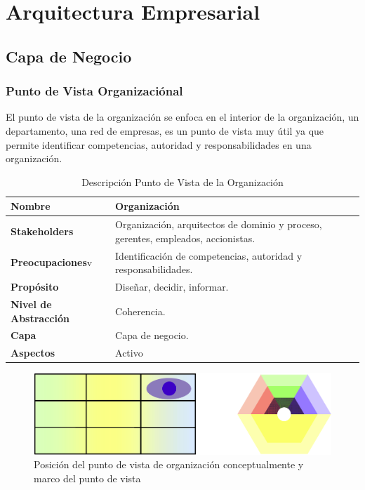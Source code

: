 \chapter{Arquitectura Empresarial}
  \section{Capa de Negocio}
    \subsection{Punto de Vista Organizaciónal}
    El punto de vista de la organización se enfoca en el interior de la organización, un departamento, una red de empresas, es un punto de vista muy útil ya que permite  identificar  competencias, autoridad y responsabilidades en una organización. \cite{ref9}
      \begin{table}[h]
        \centering
        \begin{tabular}{p{3.7cm}p{8cm}}
          \hline
          \textbf{Nombre} & \textbf{Organización} \\
          \hline
          \textbf{Stakeholders} & Organización, arquitectos de dominio y proceso, gerentes, empleados, accionistas.\\
          \textbf{Preocupaciones}v & Identificación de competencias, autoridad y responsabilidades.\\
          \textbf{Propósito} & Diseñar, decidir, informar. \\
          \textbf{Nivel de Abstracción} & Coherencia. \\
          \textbf{Capa} & Capa de negocio. \\
          \textbf{Aspectos} & Activo \\
        \end{tabular}
        \caption{Descripción Punto de Vista de la Organización \cite{ref9}}
        \label{tabla4}
      \end{table}
      \begin{figure}[h]
        \centering
        \includegraphics[scale=0.2]{Imagenes/Figuras/14}
        \caption{Posición del punto de vista de organización conceptualmente y marco del punto de vista \cite{ref9}}
        \label{figura14}
      \end{figure}
